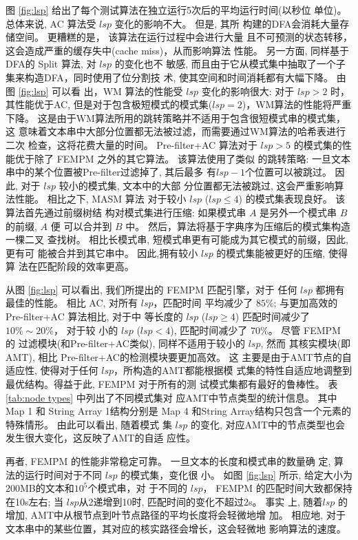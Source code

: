 图 \ref{fig:lsp} 给出了每个测试算法在独立运行5次后的平均运行时间(以秒位
单位)。 总体来说, \textsf{AC} 算法受 $lsp$ 变化的影响不大。 但是, 其所
构建的DFA会消耗大量存储空间。 更糟糕的是， 该算法在运行过程中会进行大量
且不可预测的状态转移，这会造成严重的缓存失中(cache miss)，从而影响算法
性能。 另一方面, 同样基于DFA的 \textsf{Split} 算法, 对 $lsp$ 的变化也不
敏感, 而且由于它从模式集中抽取了一个子集来构造DFA，同时使用了位分割技
术, 使其空间和时间消耗都有大幅下降。 由图 \ref{fig:lsp} 可以看
出，\textsf{WM} 算法的性能受 $lsp$ 变化的影响很大: 对于 $lsp > 2$ 时，
其性能优于AC, 但是对于包含极短模式的模式集($lsp=2$)，WM算法的性能将严重
下降。 这是由于WM算法所用的跳转策略并不适用于包含很短模式串的模式集，这
意味着文本串中大部分位置都无法被过滤，而需要通过WM算法的哈希表进行二次
检查，这将花费大量的时间。  \textsf{Pre-filter+AC} 算法对于 $lsp > 5$
的模式集的性能优于除了 \textsf{FEMPM} 之外的其它算法。 该算法使用了类似
的跳转策略: 一旦文本串中的某个位置被Pre-filter过滤掉了, 其后最多
有$lsp-1$个位置可以被跳过。 因此, 对于 $lsp$ 较小的模式集, 文本中的大部
分位置都无法被跳过, 这会严重影响算法性能。 相比之下, \textsf{MASM} 算法
对于较小 $lsp$ ($lsp \leq 4$) 的模式集表现良好。 该算法首先通过前缀树结
构对模式集进行压缩: 如果模式串 $A$ 是另外一个模式串 $B$ 的前缀, $A$ 便
可以合并到 $B$ 中。 然后，算法将基于字典序为压缩后的模式集构造一棵二叉
查找树。 相比长模式串, 短模式串更有可能成为其它模式的前缀，因此, 更有可
能被合并到其它串中。 因此,拥有较小 $lsp$ 的模式集能被更好的压缩, 使得算
法在匹配阶段的效率更高。

从图 \ref{fig:lsp} 可以看出, 我们所提出的 \textsf{FEMPM} 匹配引擎，对于
任何 $lsp$ 都拥有最佳的性能。 相比 \textsf{AC}, 对所有 $lsp$，匹配时间
平均减少了 $85\%$; 与更加高效的\textsf{Pre-filter+AC} 算法相比, 对于中
等长度的 $lsp$ ($lsp \geq 4$) 匹配时间减少了 $10\% \sim 20\%$， 对于较
小的 $lsp$ ($lsp < 4$), 匹配时间减少了 $70\%$。 尽管 \textsf{FEMPM} 的
过滤模块(和\textsf{Pre-filter+AC}类似), 同样不适用于较小的 $lsp$, 然而
其核实模块(即AMT), 相比 \textsf{Pre-filter+AC}的检测模块要更加高效。 这
主要是由于AMT节点的自适应性, 使得对于任何 $lsp$，所构造的AMT都能根据模
式集的特性自适应地调整到最优结构。得益于此, \textsf{FEMPM} 对于所有的测
试模式集都有最好的鲁棒性。 表 \ref{tab:node types} 中列出了不同模式集对
应AMT中节点类型的统计信息。 其中 Map 1 和 String Array 1结构分别是 Map
4 和String Array结构只包含一个元素的特殊情形。 由此可以看出, 随着模式
集 $lsp$ 的变化, 对应AMT中的节点类型也会发生很大变化，这反映了AMT的自适
应性。

再者, \textsf{FEMPM} 的性能非常稳定可靠。 一旦文本的长度和模式串的数量确
定, 算法的运行时间对于不同 $lsp$ 的模式集，变化很
小。 如图 \ref{fig:lsp} 所示, 给定大小为200MB的文本和$10^5$个模式串，对
于不同的 $lsp$， \textsf{FEMPM} 的匹配时间大致都保持
在10s左右; 当 $lsp$从2递增到10时, 匹配时间的变化不超过2s。 事实
上, 随着$lsp$ 的增加, AMT中从根节点到叶节点路径的平均长度将会轻微地增
加。 相应地, 对于文本串中的某些位置，其对应的核实路径会增长，这会轻微地
影响算法的速度。

